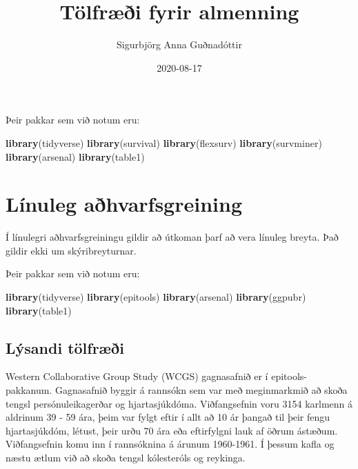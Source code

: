 \documentclass[
]{book}
\title{Tölfræði fyrir almenning}
\author{Sigurbjörg Anna Guðnadóttir}
\date{2020-08-17}
\newenvironment{Shaded}{\begin{snugshade}}{\end{snugshade}}
\newcommand{\KeywordTok}[1]{\textcolor[rgb]{0.13,0.29,0.53}{\textbf{#1}}}
\newcommand{\NormalTok}[1]{#1}
\begin{document}
\maketitle

{
\setcounter{tocdepth}{1}
\tableofcontents
}
Þeir pakkar sem við notum eru:

\begin{Shaded}
\begin{Highlighting}[]
\KeywordTok{library}\NormalTok{(tidyverse)}
\KeywordTok{library}\NormalTok{(survival)}
\KeywordTok{library}\NormalTok{(flexsurv)}
\KeywordTok{library}\NormalTok{(survminer)}
\KeywordTok{library}\NormalTok{(arsenal)}
\KeywordTok{library}\NormalTok{(table1)}
\end{Highlighting}
\end{Shaded}

\hypertarget{reg}{%
\chapter{Línuleg aðhvarfsgreining}\label{reg}}

Í línulegri aðhvarfsgreiningu gildir að útkoman þarf að vera línuleg breyta. Það gildir ekki um skýribreyturnar.

Þeir pakkar sem við notum eru:

\begin{Shaded}
\begin{Highlighting}[]
\KeywordTok{library}\NormalTok{(tidyverse)}
\KeywordTok{library}\NormalTok{(epitools)}
\KeywordTok{library}\NormalTok{(arsenal)}
\KeywordTok{library}\NormalTok{(ggpubr)}
\KeywordTok{library}\NormalTok{(table1)}
\end{Highlighting}
\end{Shaded}

\hypertarget{luxfdsandi-tuxf6lfruxe6uxf0i}{%
\section{Lýsandi tölfræði}\label{luxfdsandi-tuxf6lfruxe6uxf0i}}

Western Collaborative Group Study (WCGS) gagnasafnið er í epitools- pakkanum. Gagnasafnið byggir á rannsókn sem var með meginmarkmið að skoða tengsl persónuleikagerðar og hjartasjúkdóma. Viðfangsefnin voru 3154 karlmenn á aldrinum 39 - 59 ára, þeim var fylgt eftir í allt að 10 ár þangað til þeir fengu hjartasjúkdóm, létust, þeir urðu 70 ára eða eftirfylgni lauk af öðrum ástæðum. Viðfangsefnin komu inn í rannsóknina á árunum 1960-1961. Í þessum kafla og næstu ætlum við að skoða tengsl kólesteróls og reykinga.
\end{document}
